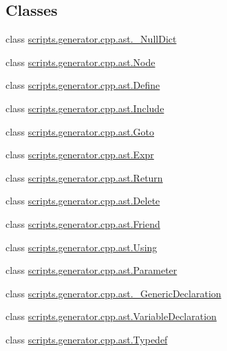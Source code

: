 \subsection*{Classes}
\begin{DoxyCompactItemize}
\item 
class \mbox{\hyperlink{classscripts_1_1generator_1_1cpp_1_1ast_1_1___null_dict}{scripts.\+generator.\+cpp.\+ast.\+\_\+\+Null\+Dict}}
\item 
class \mbox{\hyperlink{classscripts_1_1generator_1_1cpp_1_1ast_1_1_node}{scripts.\+generator.\+cpp.\+ast.\+Node}}
\item 
class \mbox{\hyperlink{classscripts_1_1generator_1_1cpp_1_1ast_1_1_define}{scripts.\+generator.\+cpp.\+ast.\+Define}}
\item 
class \mbox{\hyperlink{classscripts_1_1generator_1_1cpp_1_1ast_1_1_include}{scripts.\+generator.\+cpp.\+ast.\+Include}}
\item 
class \mbox{\hyperlink{classscripts_1_1generator_1_1cpp_1_1ast_1_1_goto}{scripts.\+generator.\+cpp.\+ast.\+Goto}}
\item 
class \mbox{\hyperlink{classscripts_1_1generator_1_1cpp_1_1ast_1_1_expr}{scripts.\+generator.\+cpp.\+ast.\+Expr}}
\item 
class \mbox{\hyperlink{classscripts_1_1generator_1_1cpp_1_1ast_1_1_return}{scripts.\+generator.\+cpp.\+ast.\+Return}}
\item 
class \mbox{\hyperlink{classscripts_1_1generator_1_1cpp_1_1ast_1_1_delete}{scripts.\+generator.\+cpp.\+ast.\+Delete}}
\item 
class \mbox{\hyperlink{classscripts_1_1generator_1_1cpp_1_1ast_1_1_friend}{scripts.\+generator.\+cpp.\+ast.\+Friend}}
\item 
class \mbox{\hyperlink{classscripts_1_1generator_1_1cpp_1_1ast_1_1_using}{scripts.\+generator.\+cpp.\+ast.\+Using}}
\item 
class \mbox{\hyperlink{classscripts_1_1generator_1_1cpp_1_1ast_1_1_parameter}{scripts.\+generator.\+cpp.\+ast.\+Parameter}}
\item 
class \mbox{\hyperlink{classscripts_1_1generator_1_1cpp_1_1ast_1_1___generic_declaration}{scripts.\+generator.\+cpp.\+ast.\+\_\+\+Generic\+Declaration}}
\item 
class \mbox{\hyperlink{classscripts_1_1generator_1_1cpp_1_1ast_1_1_variable_declaration}{scripts.\+generator.\+cpp.\+ast.\+Variable\+Declaration}}
\item 
class \mbox{\hyperlink{classscripts_1_1generator_1_1cpp_1_1ast_1_1_typedef}{scripts.\+generator.\+cpp.\+ast.\+Typedef}}

\end{DoxyCompactItemize}
